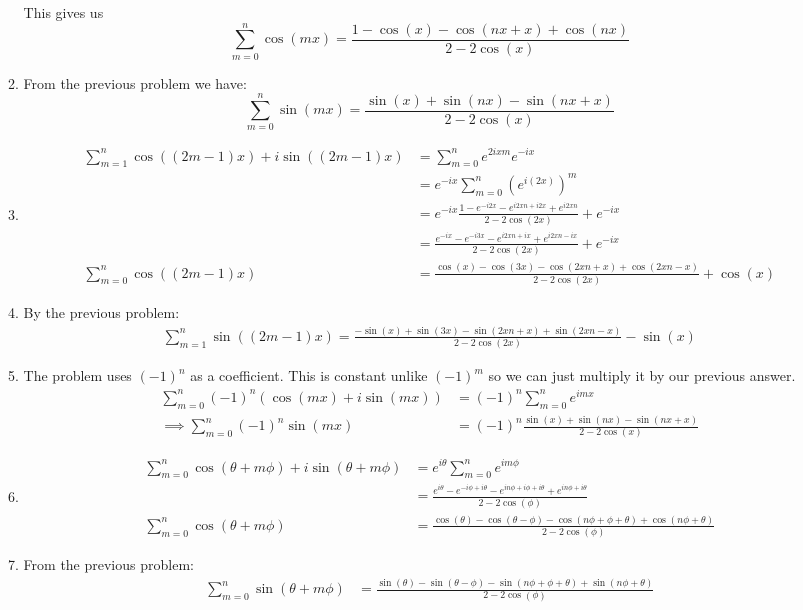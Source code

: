 \documentclass{article}
\begin{document}
\begin{enumerate}
\begin{enumerate}[label=(\roman*)]
          This gives us
          \[\sum_{m=0}^n\cos(mx)=\frac{1-\cos(x)-\cos(nx+x)+\cos(nx)}{2-2\cos(x)}\]
        \item
          From the previous problem we have:
          \[\sum_{m=0}^n\sin(mx)=\frac{\sin(x)+\sin(nx)-\sin(nx+x)}{2-2\cos(x)}\]
        \item
          \begin{align*}
            \sum_{m=1}^n\cos((2m-1)x)+i\sin((2m-1)x)&=\sum_{m=0}^ne^{2ixm}e^{-ix}\\
            &=e^{-ix}\sum_{m=0}^n\left(e^{i(2x)}\right)^m\\
            &=e^{-ix}\frac{1-e^{-i2x}-e^{i2xn+i2x}+e^{i2xn}}{2-2\cos(2x)}+e^{-ix}\\
            &=\frac{e^{-ix}-e^{-i3x}-e^{i2xn+ix}+e^{i2xn-ix}}{2-2\cos(2x)}+e^{-ix}\\
            \sum_{m=0}^n\cos((2m-1)x)&=\frac{\cos(x)-\cos(3x)-\cos(2xn+x)+\cos(2xn-x)}{2-2\cos(2x)}+\cos(x)
          \end{align*}
        \item
          By the previous problem:
          \begin{align*}
            \sum_{m=1}^n\sin((2m-1)x)=\frac{-\sin(x)+\sin(3x)-\sin(2xn+x)+\sin(2xn-x)}{2-2\cos(2x)}-\sin(x)
          \end{align*}
        \item
          The problem uses $(-1)^n$ as a coefficient. This is constant unlike $(-1)^m$ so we can just multiply it by our previous answer.
          \begin{align*}
            \sum_{m=0}^n(-1)^n(\cos(mx)+i\sin(mx))&=(-1)^n\sum_{m=0}^ne^{imx}\\
            \implies\sum_{m=0}^n(-1)^n\sin(mx)&=(-1)^n\frac{\sin(x)+\sin(nx)-\sin(nx+x)}{2-2\cos(x)}
          \end{align*}
        \item
          \begin{align*}
            \sum_{m=0}^n\cos(\theta+m\phi)+i\sin(\theta+m\phi)&=e^{i\theta} \sum_{m=0}^ne^{im\phi}\\
            &=\frac{e^{i\theta}-e^{-i\phi+i\theta}-e^{in\phi+i\phi+i\theta}+e^{in\phi+i\theta}}{2-2\cos(\phi)}\\
            \sum_{m=0}^n\cos(\theta+m\phi)&=\frac{\cos(\theta)-\cos(\theta-\phi)-\cos(n\phi+\phi+\theta)+\cos(n\phi+\theta)}{2-2\cos(\phi)}
          \end{align*}
        \item
          From the previous problem:
          \begin{align*}
            \sum_{m=0}^n\sin(\theta+m\phi)&=\frac{\sin(\theta)-\sin(\theta-\phi)-\sin(n\phi+\phi+\theta)+\sin(n\phi+\theta)}{2-2\cos(\phi)}
          \end{align*}
      \end{enumerate}
  \end{enumerate}
\end{document}
